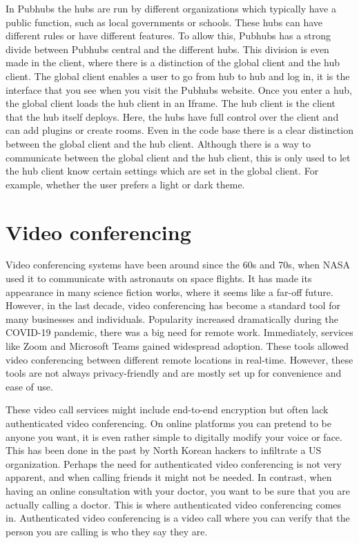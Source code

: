 \documentclass{report}
\begin{document}
In Pubhubs the hubs are run by different organizations which typically have a public function, such as
local governments or schools.
These hubs can have different rules or have different features.
To allow this, Pubhubs has a strong divide between Pubhubs central and the different hubs.
This division is even made in the client, where there is a distinction of the global client and the hub client.
The global client enables a user to go from hub to hub and log in, it is
the interface that you see when you visit the Pubhubs website.
Once you enter a hub, the global client loads the hub client in an Iframe. The hub client
is the client that the hub itself deploys. Here, the hubs have full control
over the client and can add plugins or create rooms.
Even in the code base there is a clear distinction between the global client and the hub client.
Although there is a way to communicate between the global client and the hub client, this
is only used to let the hub client know certain settings which are set in the global client.
For example, whether the user prefers a light or dark theme.


\section{Video conferencing}
Video conferencing systems have been around since the 60s and 70s, when NASA used it to communicate with astronauts
on space flights. It has made its appearance in many science fiction works, where it seems like a far-off future.
However, in the last decade, video conferencing has become a standard tool for many businesses and individuals.
Popularity increased dramatically during the COVID-19 pandemic, there was a big need for remote work. Immediately,
services like Zoom \cite{noauthor_one_nodate} and Microsoft Teams  \cite{noauthor_microsoft_nodate} gained
widespread adoption. These tools allowed video conferencing between different remote locations in real-time.
However, these tools are not always privacy-friendly and are mostly set up for convenience and ease of use.

These video call services might include end-to-end encryption but often lack authenticated video conferencing. On
online platforms you can pretend to be anyone you want, it is even rather simple to digitally modify your voice or
face. This has been done in the past by North Korean hackers to infiltrate a US organization. Perhaps the need for
authenticated video conferencing is not very apparent, and when calling friends it might not be needed. In contrast, when having an online consultation with your doctor, you
want to be sure that you are actually calling a doctor. This is where authenticated video conferencing comes in.
Authenticated video conferencing is a video call where you can verify that the person you are calling is who they say they are.
\end{document}

